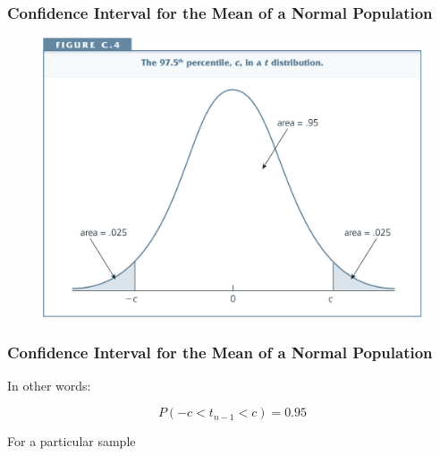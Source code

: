 \documentclass[12pt]{beamer}
\begin{document}
\begin{frame}
\frametitle{Confidence Interval for the Mean of a Normal Population}
\begin{figure}[htp]
\centering
\includegraphics[scale=0.10]{images/FigureC4.jpg}
\end{figure}
\end{frame}

\begin{frame}
\frametitle{Confidence Interval for the Mean of a Normal Population}
In other words:

\begin{equation*}
P(-c < t_{n-1} < c) = 0.95
\end{equation*}

\vspace{2mm}
For a particular sample 

\begin{equation*}
[\bar{y} - c s/\sqrt{n} \mbox{,} \quad \bar{y} + c s/\sqrt{n}]
\end{equation*}

\end{frame}
\end{document}
